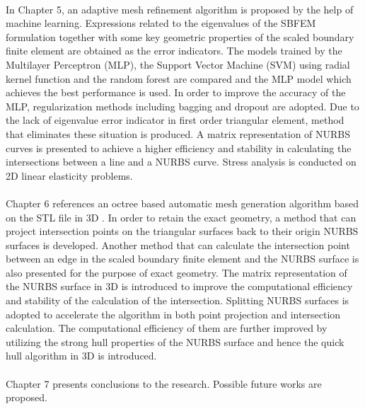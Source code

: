 \paragraph{}
In Chapter 5, an adaptive mesh refinement algorithm is proposed by the help of machine learning.
Expressions related to the eigenvalues of the SBFEM formulation together with some key geometric properties of the scaled boundary finite element are obtained as the error indicators.
The models trained by the Multilayer Perceptron (MLP), the Support Vector Machine (SVM) using radial kernel function and the random forest are compared and the MLP model which achieves the best performance is used.
In order to improve the accuracy of the MLP, regularization methods including bagging and dropout are adopted.
Due to the lack of eigenvalue error indicator in first order triangular element, method that eliminates these situation is produced.
A matrix representation of NURBS curves is presented to achieve a higher efficiency and stability in calculating the intersections between a line and a NURBS curve.
Stress analysis is conducted on 2D linear elasticity problems.

\paragraph{}
Chapter 6 references an octree based automatic mesh generation algorithm based on the STL file in 3D \citep{Liu2017}.
In order to retain the exact geometry, a method that can project intersection points on the triangular surfaces back to their origin NURBS surfaces is developed.
Another method that can calculate the intersection point between an edge in the scaled boundary finite element and the NURBS surface is also presented for the purpose of exact geometry.
The matrix representation of the NURBS surface in 3D is introduced to improve the computational efficiency and stability of the calculation of the intersection.
Splitting NURBS surfaces is adopted to accelerate the algorithm in both point projection and intersection calculation.
The computational efficiency of them are further improved by utilizing the strong hull properties of the NURBS surface and hence the quick hull algorithm in 3D is introduced.

\paragraph{}
Chapter 7 presents conclusions to the research.
Possible future works are proposed.